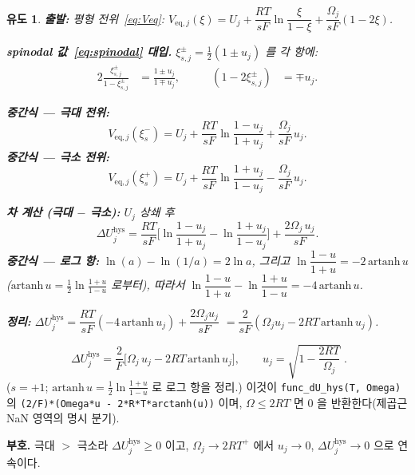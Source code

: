 \documentclass[11pt,a4paper]{article}
\newtheorem*{derivebox}{유도}
\newcommand{\eq}{\mathrm{eq}}
\newcommand{\hys}{\mathrm{hys}}
\newcommand{\code}[1]{\texttt{#1}}
\begin{document}
\begin{derivebox}
\textbf{출발: } 평형 전위~\eqref{eq:Veq}: $V_{\eq,j}(\xi)=U_j+\dfrac{RT}{sF}\ln\dfrac{\xi}{1-\xi}+\dfrac{\Omega_j}{sF}(1-2\xi)$.

\textbf{spinodal 값~\eqref{eq:spinodal} 대입.} $\xi_{s,j}^\pm=\tfrac12(1\pm u_j)$ 를 각 항에:
\begin{alignat*}{2}
\frac{\xi_{s,j}^\pm}{1-\xi_{s,j}^\pm}&=\frac{1\pm u_j}{1\mp u_j},\qquad
&(1-2\xi_{s,j}^\pm)&=\mp u_j.
\end{alignat*}

\textbf{중간식 — 극대 전위:}
\begin{equation*}
V_{\eq,j}(\xi_{s}^-)=U_j+\frac{RT}{sF}\ln\frac{1-u_j}{1+u_j}+\frac{\Omega_j}{sF}\,u_j.
\end{equation*}
\textbf{중간식 — 극소 전위:}
\begin{equation*}
V_{\eq,j}(\xi_{s}^+)=U_j+\frac{RT}{sF}\ln\frac{1+u_j}{1-u_j}-\frac{\Omega_j}{sF}\,u_j.
\end{equation*}

\textbf{차 계산 (극대 $-$ 극소):} $U_j$ 상쇄 후
\begin{equation*}
\Delta U_j^\hys=\frac{RT}{sF}\bigg[\ln\frac{1-u_j}{1+u_j}-\ln\frac{1+u_j}{1-u_j}\bigg]
+\frac{2\Omega_j\,u_j}{sF}.
\end{equation*}
\textbf{중간식 — 로그 항:} $\ln(a)-\ln(1/a)=2\ln a$, 그리고
$\ln\dfrac{1-u}{1+u}=-2\,\mathrm{artanh}\,u$ ($\mathrm{artanh}\,u=\tfrac12\ln\tfrac{1+u}{1-u}$ 로부터),
따라서 $\ln\dfrac{1-u}{1+u}-\ln\dfrac{1+u}{1-u}=-4\,\mathrm{artanh}\,u$.

\textbf{정리:} $\Delta U_j^\hys=\dfrac{RT}{sF}(-4\,\mathrm{artanh}\,u_j)+\dfrac{2\Omega_j u_j}{sF}$
$=\dfrac{2}{sF}(\Omega_j u_j-2RT\,\mathrm{artanh}\,u_j)$.
\end{derivebox}

\begin{equation}
\boxed{\;\Delta U_j^\hys
=\frac{2}{F}\Big[\Omega_j\,u_j-2RT\,\mathrm{artanh}\,u_j\Big],
\qquad u_j=\sqrt{1-\frac{2RT}{\Omega_j}}\;.}
\label{eq:dUhys}
\end{equation}
($s=+1$; $\mathrm{artanh}\,u=\tfrac12\ln\tfrac{1+u}{1-u}$ 로 로그 항을 정리.) 이것이 \code{func\_dU\_hys(T, Omega)} 의
\code{(2/F)*(Omega*u - 2*R*T*arctanh(u))} 이며, $\Omega\le2RT$ 면 $0$ 을 반환한다(제곱근 NaN 영역의 명시 분기).

\textbf{부호.} 극대 $>$ 극소라 $\Delta U_j^\hys\ge0$ 이고, $\Omega_j\to2RT^+$ 에서 $u_j\to0$, $\Delta U_j^\hys\to0$ 으로
연속이다.
\end{document}
